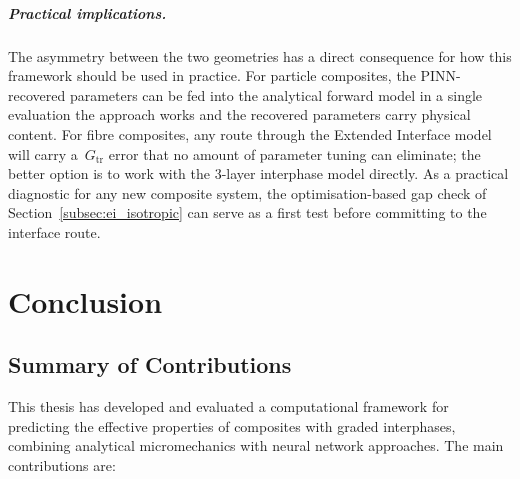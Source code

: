 \documentclass[oneside, 12pt, a4paper, bibliography=totoc]{book}
\begin{document}
\paragraph{Practical implications.}
The asymmetry between the two geometries has a direct consequence for how this framework should be used in practice. For particle composites, the PINN-recovered parameters can be fed into the analytical forward model in a single evaluation the approach works and the recovered parameters carry physical content. For fibre composites, any route through the Extended Interface model will carry a~$G_{\text{tr}}$ error that no amount of parameter tuning can eliminate; the better option is to work with the 3-layer interphase model directly. As a practical diagnostic for any new composite system, the optimisation-based gap check of Section~\ref{subsec:ei_isotropic} can serve as a first test before committing to the interface route.


\chapter{Conclusion}
\label{ch:conclusion}

\section{Summary of Contributions}

This thesis has developed and evaluated a computational framework for predicting the effective properties of composites with graded interphases, combining analytical micromechanics with neural network approaches. The main contributions are:
\end{document}
